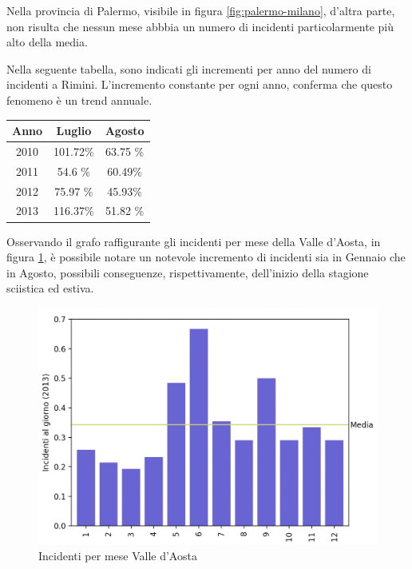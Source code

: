 \documentclass[a4paper]{report}
\begin{document}
Nella provincia di Palermo, visibile in figura \ref{fig:palermo-milano}, d'altra parte, 
non risulta che nessun mese abbbia un numero di incidenti 
particolarmente più alto della media.

Nella seguente tabella, sono indicati gli incrementi per anno del numero di incidenti a Rimini.
L'incremento constante per ogni anno, conferma che questo fenomeno è un trend annuale.

\begin{center}
    \def\arraystretch{1.5}%
    \begin{tabular}{ |c|c|c| } 
    \hline
    Anno & Luglio   & Agosto \\ 
    \hline
    \rowcolor{TableGray}
    2010 & 101.72\% & 63.75 \% \\ 
    2011 & 54.6  \%  & 60.49\% \\
    \rowcolor{TableGray}
    2012 & 75.97 \%  & 45.93\%\\
    2013 & 116.37\% & 51.82 \%\\
    \hline
    \end{tabular}
\end{center}

Osservando il grafo raffigurante gli incidenti per mese della Valle d'Aosta, in figura \ref{fig:aosta}, 
è possibile notare un notevole incremento di incidenti sia in Gennaio che in Agosto, possibili 
conseguenze, rispettivamente, dell'inizio della stagione sciistica ed estiva.

\begin{figure}
    \includegraphics[width=\linewidth]{../src/incidenti/incidenti_senza_coords/mese_incidenti/aosta_mese.png}
    \caption{Incidenti per mese Valle d'Aosta}
    \label{fig:aosta}
\end{figure}
\end{document}
